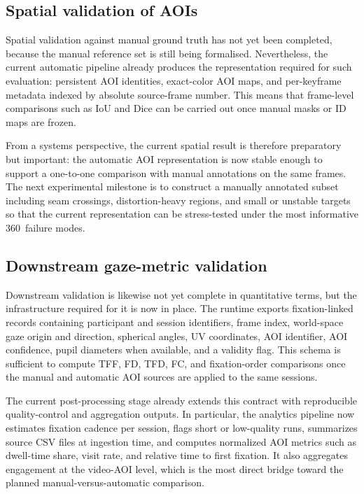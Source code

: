 \documentclass[11pt]{article}
\begin{document}
\subsection{Spatial validation of AOIs}
Spatial validation against manual ground truth has not yet been completed, because the manual reference set is still being formalised. Nevertheless, the current automatic pipeline already produces the representation required for such evaluation: persistent AOI identities, exact-color AOI maps, and per-keyframe metadata indexed by absolute source-frame number. This means that frame-level comparisons such as IoU and Dice can be carried out once manual masks or ID maps are frozen.

From a systems perspective, the current spatial result is therefore preparatory but important: the automatic AOI representation is now stable enough to support a one-to-one comparison with manual annotations on the same frames. The next experimental milestone is to construct a manually annotated subset including seam crossings, distortion-heavy regions, and small or unstable targets so that the current representation can be stress-tested under the most informative 360\textdegree\ failure modes.

\subsection{Downstream gaze-metric validation}
Downstream validation is likewise not yet complete in quantitative terms, but the infrastructure required for it is now in place. The runtime exports fixation-linked records containing participant and session identifiers, frame index, world-space gaze origin and direction, spherical angles, UV coordinates, AOI identifier, AOI confidence, pupil diameters when available, and a validity flag. This schema is sufficient to compute TFF, FD, TFD, FC, and fixation-order comparisons once the manual and automatic AOI sources are applied to the same sessions.

The current post-processing stage already extends this contract with reproducible quality-control and aggregation outputs. In particular, the analytics pipeline now estimates fixation cadence per session, flags short or low-quality runs, summarizes source CSV files at ingestion time, and computes normalized AOI metrics such as dwell-time share, visit rate, and relative time to first fixation. It also aggregates engagement at the video-AOI level, which is the most direct bridge toward the planned manual-versus-automatic comparison.
\end{document}
